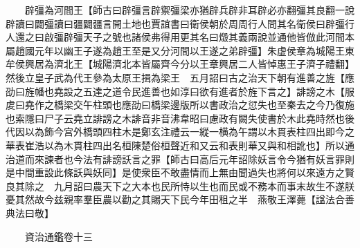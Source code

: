 　　辟彊為河間王【師古曰辟彊言辟禦彊梁亦猶辟兵辟非耳辟必亦翻彊其良翻一說辟讀曰闢彊讀曰疆闢疆言開土地也賈誼書曰衛侯朝於周周行人問其名衛侯曰辟彊行人還之曰啟彊辟彊天子之號也諸侯弗得用更其名曰燬其義兩說並通他皆倣此河間本屬趙國元年以幽王子遂為趙王至是又分河間以王遂之弟辟彊】朱虚侯章為城陽王東牟侯興居為濟北王【城陽濟北本皆屬齊今分以王章興居二人皆悼惠王子濟子禮翻】然後立皇子武為代王參為太原王揖為梁王　五月詔曰古之治天下朝有進善之旌【應劭曰旌幡也堯設之五達之道令民進善也如淳曰欲有進者於旌下言之】誹謗之木【服䖍曰堯作之橋梁交午柱頭也應劭曰橋梁邊版所以書政治之愆失也至秦去之今乃復施也索隱曰尸子云堯立誹謗之木誹音非音沸韋昭曰慮政有闕失使書於木此堯時然也後代因以為飾今宫外橋頭四柱木是鄭玄注禮云一縱一横為午謂以木貫表柱四出即今之華表崔浩以為木貫柱四出名桓陳楚俗桓聲近和又云和表則華又與和相訛也】所以通治道而來諫者也今法有誹謗訞言之罪【師古曰高后元年詔除妖言令今猶有妖言罪則是中間重設此條訞與妖同】是使衆臣不敢盡情而上無由聞過失也將何以來遠方之賢良其除之　九月詔曰農天下之大本也民所恃以生也而民或不務本而事末故生不遂朕憂其然故今兹親率羣臣農以勸之其賜天下民今年田租之半　燕敬王澤薨【諡法合善典法曰敬】

　　資治通鑑卷十三


    


 


 



 

 
  







 


　　
　　
　
　
　


　　

　















	
	









































